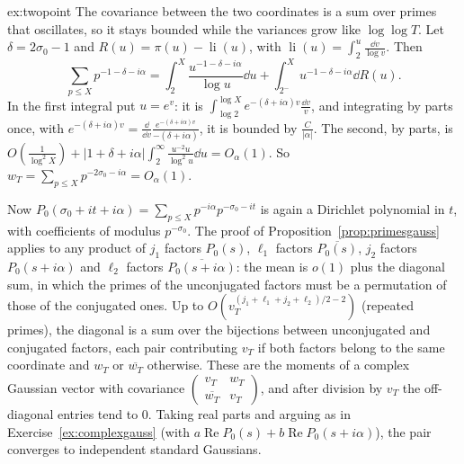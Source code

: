 \begin{solution}{ex:twopoint}
\idea The covariance between the two coordinates is a sum over primes that oscillates, so it stays bounded while the variances grow like $\log\log T$.
\writeup Let $\delta=2\sigma_0-1$ and $R(u)=\pi(u)-\operatorname{li}(u)$, with $\operatorname{li}(u)=\int_2^u\frac{\dd v}{\log v}$. Then
\[
\sum_{p\le X}p^{-1-\delta-i\alpha}=\int_2^X\frac{u^{-1-\delta-i\alpha}}{\log u}\dd u+\int_{2^-}^Xu^{-1-\delta-i\alpha}\dd R(u).
\]
In the first integral put $u=e^v$: it is $\int_{\log2}^{\log X}e^{-(\delta+i\alpha)v}\frac{\dd v}v$, and integrating by parts once, with $e^{-(\delta+i\alpha)v}=\frac{\dd}{\dd v}\frac{e^{-(\delta+i\alpha)v}}{-(\delta+i\alpha)}$, it is bounded by $\frac{C}{|\alpha|}$. The second, by parts, is $O(\frac1{\log^2X})+|1+\delta+i\alpha|\int_2^\infty\frac{u^{-2}u}{\log^2u}\dd u=O_\alpha(1)$. So $w_T=\sum_{p\le X}p^{-2\sigma_0-i\alpha}=O_\alpha(1)$.

Now $P_0(\sigma_0+it+i\alpha)=\sum_{p\le X}p^{-i\alpha}p^{-\sigma_0-it}$ is again a Dirichlet polynomial in $t$, with coefficients of modulus $p^{-\sigma_0}$. The proof of Proposition~\ref{prop:primesgauss} applies to any product of $j_1$ factors $P_0(s)$, $\ell_1$ factors $\overline{P_0(s)}$, $j_2$ factors $P_0(s+i\alpha)$ and $\ell_2$ factors $\overline{P_0(s+i\alpha)}$: the mean is $o(1)$ plus the diagonal sum, in which the primes of the unconjugated factors must be a permutation of those of the conjugated ones. Up to $O(v_T^{(j_1+\ell_1+j_2+\ell_2)/2-2})$ (repeated primes), the diagonal is a sum over the bijections between unconjugated and conjugated factors, each pair contributing $v_T$ if both factors belong to the same coordinate and $w_T$ or $\overline{w_T}$ otherwise. These are the moments of a complex Gaussian vector with covariance $\begin{pmatrix}v_T&w_T\\\overline{w_T}&v_T\end{pmatrix}$, and after division by $v_T$ the off-diagonal entries tend to $0$. Taking real parts and arguing as in Exercise~\ref{ex:complexgauss} (with $a\operatorname{Re}P_0(s)+b\operatorname{Re}P_0(s+i\alpha)$), the pair converges to independent standard Gaussians.
\end{solution}

